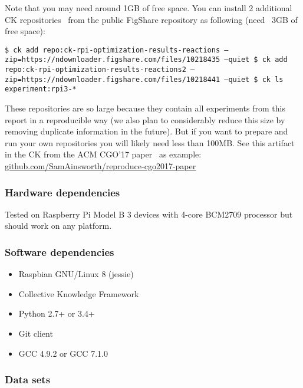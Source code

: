 Note that you may need around 1GB of free space. You can install 2 additional CK repositories~\cite{fursin_lokhmotov_upton_2018} 
from the public FigShare repository as following (need ~3GB of free space):

\begin{flushleft}
\texttt{\$ ck add repo:ck-rpi-optimization-results-reactions --zip=https://ndownloader.figshare.com/files/10218435 --quiet \newline
\$ ck add repo:ck-rpi-optimization-results-reactions2 --zip=https://ndownloader.figshare.com/files/10218441 --quiet \newline
\$ ck ls experiment:rpi3-* \newline}
\end{flushleft}

These repositories are so large because they contain all experiments from this report in a reproducible way
(we also plan to considerably reduce this size by removing duplicate information in the future). 
But if you want to prepare and run your own repositories you will likely need less than 100MB. 
See this artifact in the CK from the ACM CGO'17 paper~\cite{Ainsworth:2017:SPI:3049832.3049865} as example: 
\href{https://github.com/SamAinsworth/reproduce-cgo2017-paper}{github.com/SamAinsworth/reproduce-cgo2017-paper}

\subsubsection{Hardware dependencies}

Tested on Raspberry Pi Model B 3 devices with 4-core BCM2709 processor but should work on any platform.

\subsubsection{Software dependencies}

\begin{itemize}
  \item Raspbian GNU/Linux 8 (jessie)
  \item Collective Knowledge Framework~\cite{ck,ck-date16}
  \item Python 2.7+ or 3.4+
  \item Git client
  \item GCC 4.9.2 or GCC 7.1.0
\end{itemize}

\subsubsection{Data sets}

